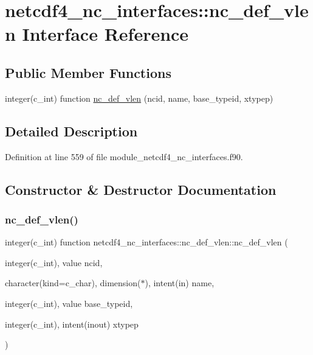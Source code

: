 \hypertarget{interfacenetcdf4__nc__interfaces_1_1nc__def__vlen}{}\section{netcdf4\+\_\+nc\+\_\+interfaces\+:\+:nc\+\_\+def\+\_\+vlen Interface Reference}
\label{interfacenetcdf4__nc__interfaces_1_1nc__def__vlen}
\subsection*{Public Member Functions}
\begin{DoxyCompactItemize}
\item 
integer(c\+\_\+int) function \hyperlink{interfacenetcdf4__nc__interfaces_1_1nc__def__vlen_a1a0ec1f2f95e19267d4e70fff88821bd}{nc\+\_\+def\+\_\+vlen} (ncid, name, base\+\_\+typeid, xtypep)
\end{DoxyCompactItemize}


\subsection{Detailed Description}


Definition at line 559 of file module\+\_\+netcdf4\+\_\+nc\+\_\+interfaces.\+f90.



\subsection{Constructor \& Destructor Documentation}
\mbox{\label{interfacenetcdf4__nc__interfaces_1_1nc__def__vlen_a1a0ec1f2f95e19267d4e70fff88821bd}} 
\subsubsection{\texorpdfstring{nc\+\_\+def\+\_\+vlen()}{nc\_def\_vlen()}}
{\footnotesize\ttfamily integer(c\+\_\+int) function netcdf4\+\_\+nc\+\_\+interfaces\+::nc\+\_\+def\+\_\+vlen\+::nc\+\_\+def\+\_\+vlen (\begin{DoxyParamCaption}\item[{integer(c\+\_\+int), value}]{ncid,  }\item[{character(kind=c\+\_\+char), dimension($\ast$), intent(in)}]{name,  }\item[{integer(c\+\_\+int), value}]{base\+\_\+typeid,  }\item[{integer(c\+\_\+int), intent(inout)}]{xtypep }\end{DoxyParamCaption})}



